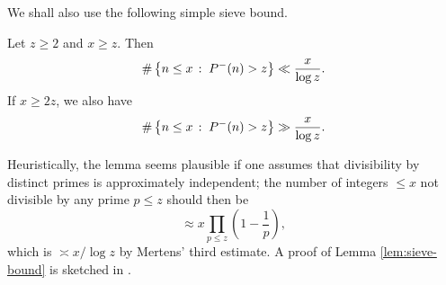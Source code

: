 We shall also use the following simple sieve bound.
\begin{lemma} \label{lem:sieve-bound}
    Let $z \ge 2$ and $x \ge z$. Then
    \begin{equation*}
        \#\left\{n \le x\,:\;P^-(n) > z\right\} \ll \frac{x}{\log z}.
    \end{equation*}
    If $x \ge 2z$, we also have
    \begin{equation*}
        \#\left\{n \le x\,:\;P^-(n) > z\right\} \gg \frac{x}{\log z}.
    \end{equation*}
\end{lemma}
Heuristically, the lemma seems plausible if one assumes that divisibility by distinct primes is approximately independent; the number of integers $\le x$ not divisible by any prime $p \le z$ should then be
\begin{equation*}
    \approx x \prod_{p \le z} \left( 1 - \frac{1}{p} \right),
\end{equation*}
which is $\asymp x/ \log z$ by Mertens' third estimate.
A proof of Lemma \ref{lem:sieve-bound} is sketched in \cite[Exercise 02]{divisors}.

